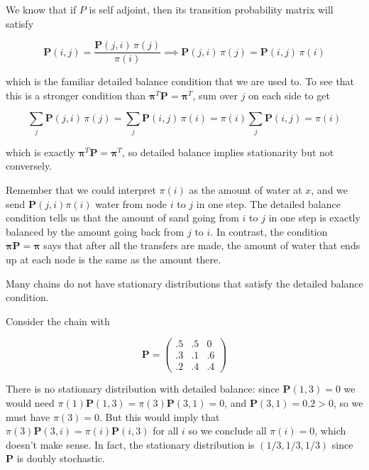 	\begin{example}
		\label{ex:detailed-balance-in-finite-state-space}
		We know that if $P$ is self adjoint, then its transition probability matrix will satisfy 

			\begin{equation}
				\mathbf{P}(i, j) = \frac{\mathbf{P}(j, i) \, \pi(j)}{\pi(i)} \implies \mathbf{P}(j, i) \, \pi(j) = \mathbf{P}(i, j) \, \pi(i)
			\end{equation}

		which is the familiar detailed balance condition that we are used to. To see that this is a stronger condition than $\boldsymbol{\pi}^T \mathbf{P} = \boldsymbol{\pi}^T$, sum over $j$ on each side to get 

			\begin{equation}
				\sum_j \mathbf{P}(j, i) \, \pi(j) = \sum_j \mathbf{P}(i, j) \, \pi(i) = \pi(i) \sum_j \mathbf{P}(i, j) = \pi(i)
			\end{equation}

		which is exactly $\boldsymbol{\pi}^T \mathbf{P} = \boldsymbol{\pi}^T$, so detailed balance implies stationarity but not conversely.

		Remember that we could interpret $\pi(i)$ as the amount of water at $x$, and we send $\mathbf{P}(j, i) \pi(i)$ water from node $i$ to $j$ in one step. The detailed balance condition tells us that the amount of sand going from $i$ to $j$ in one step is exactly balanced by the amount going back from $j$ to $i$. In contrast, the condition $\boldsymbol{\pi} \mathbf{P} = \boldsymbol{\pi}$ says that after all the transfers are made, the amount of water that ends up at each node is the same as the amount there. 
	\end{example}

	Many chains do not have stationary distributions that satisfy the detailed balance condition. 

	\begin{example}
		\label{ex:stationary-distribution-and-detailed-balance}
		Consider the chain with 

			\begin{equation}
				\mathbf{P} = \begin{pmatrix} .5 & .5 & 0 \\ .3 & .1 & .6 \\ .2 & .4 & .4 \end{pmatrix}
			\end{equation}

		There is no stationary distribution with detailed balance: since $\mathbf{P}(1, 3) = 0$ we would need $\pi(1) \mathbf{P}(1, 3) = \pi(3) \mathbf{P}(3, 1) = 0$, and $\mathbf{P}(3, 1) = 0.2 > 0$, so we must have $\pi(3) = 0$. But this would imply that $\pi(3) \mathbf{P}(3, i) = \pi(i) \mathbf{P}(i, 3)$ for all $i$ so we conclude all $\pi(i) = 0$, which doesn't make sense. In fact, the stationary distribution is $(1/3, 1/3, 1/3)$ since $\mathbf{P}$ is doubly stochastic. 
	\end{example}

